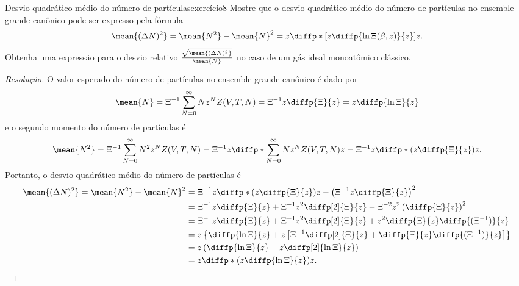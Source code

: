 \begin{exercício}{Desvio quadrático médio do número de partículas}{exercício8}
    Mostre que o desvio quadrático médio do número de partículas no ensemble grande canônico pode ser expresso pela fórmula
    \begin{equation*}
        \mean{(\Delta N)^2} = \mean{N^2}-\mean{N}^2 = z\diffp*{\left[z \diffp{\ln \Xi(\beta, z)}{z}\right]}{z}.
    \end{equation*}
    Obtenha uma expressão para o desvio relativo \(\frac{\sqrt{\mean{(\Delta N)^2}}}{\mean{N}}\) no caso de um gás ideal monoatômico clássico.
\end{exercício}
\begin{proof}[Resolução]
    O valor esperado do número de partículas no ensemble grande canônico é dado por
    \begin{equation*}
        \mean{N} = \Xi^{-1} \sum_{N = 0}^\infty N z^N Z(V, T, N) = \Xi^{-1} z\diffp{\Xi}{z} = z \diffp{\ln \Xi}{z}
    \end{equation*}
    e o segundo momento do número de partículas é
    \begin{equation*}
        \mean{N^2} = \Xi^{-1} \sum_{N= 0}^\infty N^2 z^N Z(V, T, N)
                   = \Xi^{-1} z \diffp*{\sum_{N = 0}^\infty N z^N Z(V, T, N)}{z}
                   = \Xi^{-1} z \diffp*{\left(z \diffp{\Xi}{z}\right)}{z}.
    \end{equation*}
    Portanto, o desvio quadrático médio do número de partículas é
    \begin{align*}
        \mean{(\Delta N)^2} = \mean{N^2} - \mean{N}^2 &= \Xi^{-1} z\diffp*{\left(z\diffp{\Xi}{z}\right)}{z} - \left(\Xi^{-1} z\diffp{\Xi}{z}\right)^2\\
                                                      &= \Xi^{-1} z \diffp{\Xi}{z} + \Xi^{-1} z^2 \diffp[2]{\Xi}{z} - \Xi^{-2} z^2 \left(\diffp{\Xi}{z}\right)^2\\
                                                      &= \Xi^{-1} z \diffp{\Xi}{z} + \Xi^{-1} z^2 \diffp[2]{\Xi}{z} + z^2 \diffp{\Xi}{z} \diffp{(\Xi^{-1})}{z}\\
                                                      &= z \left\{\diffp{\ln{\Xi}}{z} + z\left[\Xi^{-1} \diffp[2]{\Xi}{z} + \diffp{\Xi}{z} \diffp{(\Xi^{-1})}{z} \right]\right\}\\
                                                      &= z \left(\diffp{\ln\Xi}{z} + z \diffp[2]{\ln\Xi}{z}\right)\\
                                                      &= z \diffp*{\left(z \diffp{\ln\Xi}{z}\right)}{z}.
    \end{align*}


\end{proof}
